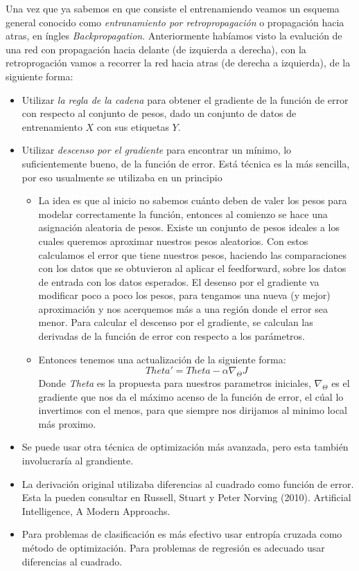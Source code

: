 Una vez que ya sabemos en que consiste el entrenamiendo veamos un esquema general conocido como \emph{entranamiento por retropropagación} o propagación hacia atras, en íngles \textit{Backpropagation}. Anteriormente habíamos visto la evalución de una red con propagación hacia delante (de izquierda a derecha), con la retroprogación vamos a recorrer la red hacia atras (de derecha a izquierda), de la siguiente forma:
\begin{itemize}
 \item Utilizar \emph{la regla de la cadena} para obtener el gradiente de la función de error con
respecto al conjunto de pesos, dado un conjunto de datos de entrenamiento \emph{$X$} con sus etiquetas \emph{$Y$}.
\item Utilizar \emph{descenso por el gradiente} para encontrar un mínimo, lo suficientemente
bueno, de la función de error. Está técnica es la más sencilla, por eso usualmente se utilizaba en un principio
\begin{itemize}
 \item La idea es que al inicio no sabemos cuánto deben de valer los pesos para modelar correctamente la función, entonces 
 al comienzo se hace una asignación aleatoria de pesos. Existe un conjunto de pesos ideales a los cuales queremos aproximar nuestros pesos aleatorios. Con estos calculamos el error que tiene nuestros pesos, haciendo las comparaciones con los datos que se obtuvieron al aplicar el feedforward, sobre los datos de entrada con los datos esperados. El desenso por el gradiente va modificar poco a poco los pesos, para tengamos una nueva (y mejor) aproximación y nos acerquemos más a una región donde el error sea menor.
 Para calcular el descenso por el gradiente, se calculan las derivadas de la función de error con respecto a los parámetros. 
 \item Entonces tenemos una actualización de la siguiente forma: 
    \begin{equation}
     Theta' = Theta - \alpha \nabla_{\Theta}J
    \end{equation}
        Donde \emph{Theta} es la propuesta para nuestros parametros iniciales, $\nabla_{\Theta}$ es el gradiente que nos da el máximo acenso de la función de error, el cúal lo invertimos con el menos, para que siempre nos dirijamos al minimo local más proximo.  
\end{itemize}

\item Se puede usar otra técnica de optimización más avanzada, pero esta también involucraría al grandiente. 

\item La derivación original utilizaba diferencias al cuadrado como función de error. Esta la pueden consultar en 
Russell, Stuart y Peter Norving (2010). Artificial Intelligence, A Modern Approachs.

\item Para problemas de clasificación es más efectivo usar entropía cruzada como método de optimización. Para problemas de regresión es adecuado usar diferencias al cuadrado.
\end{itemize}
